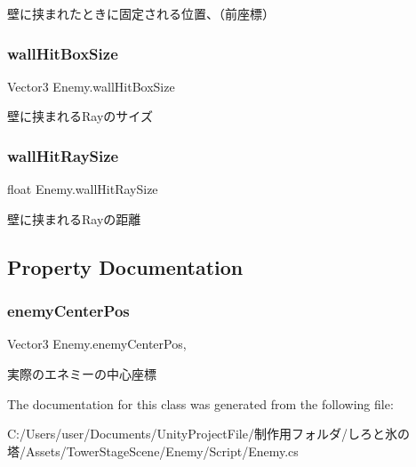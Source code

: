 壁に挟まれたときに固定される位置、（前座標） 

\mbox{\label{class_enemy_a6aa9348e5d07b274d08d045a8562f511}} 
\subsubsection{\texorpdfstring{wall\+Hit\+Box\+Size}{wallHitBoxSize}}
{\footnotesize\ttfamily Vector3 Enemy.\+wall\+Hit\+Box\+Size\hspace{0.3cm}{\ttfamily [private]}}



壁に挟まれる\+Rayのサイズ 

\mbox{\label{class_enemy_a8b7dc2553eb9f3a3a4bdcbe0dc390ede}} 
\subsubsection{\texorpdfstring{wall\+Hit\+Ray\+Size}{wallHitRaySize}}
{\footnotesize\ttfamily float Enemy.\+wall\+Hit\+Ray\+Size\hspace{0.3cm}{\ttfamily [private]}}



壁に挟まれる\+Rayの距離 



\subsection{Property Documentation}
\mbox{\label{class_enemy_ac8ac5520ab8c301a37b2482c6626fba7}} 
\subsubsection{\texorpdfstring{enemy\+Center\+Pos}{enemyCenterPos}}
{\footnotesize\ttfamily Vector3 Enemy.\+enemy\+Center\+Pos\hspace{0.3cm}{\ttfamily [get]}, {\ttfamily [protected]}}



実際のエネミーの中心座標 



The documentation for this class was generated from the following file\+:\begin{DoxyCompactItemize}
\item 
C\+:/\+Users/user/\+Documents/\+Unity\+Project\+File/制作用フォルダ/しろと氷の塔/\+Assets/\+Tower\+Stage\+Scene/\+Enemy/\+Script/Enemy.\+cs\end{DoxyCompactItemize}
